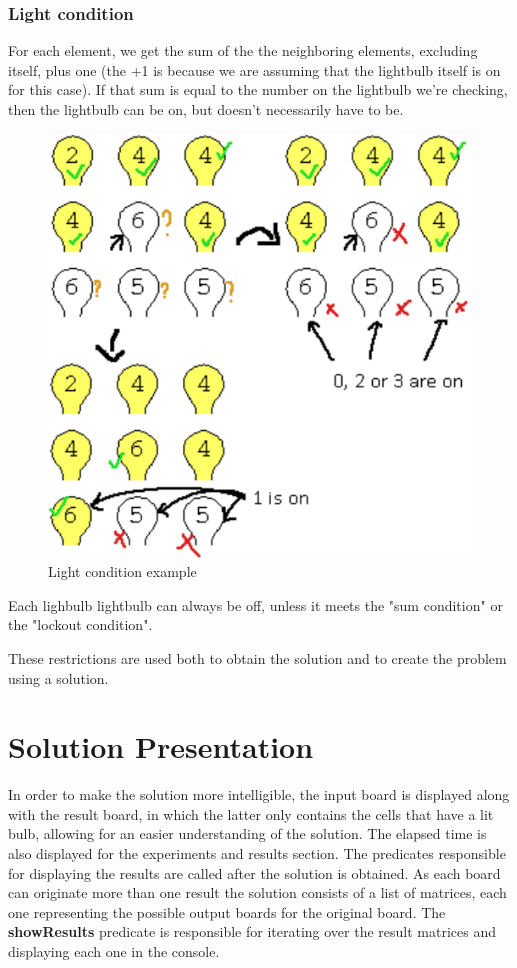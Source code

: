 \documentclass[runningheads]{llncs}
\begin{document}
\subsubsection*{Light condition} \hfill \break
For each element, we get the sum of the the neighboring elements, excluding itself, plus one (the +1 is because we are assuming that the lightbulb itself is on for this case).
If that sum is equal to the number on the lightbulb we're checking, then the lightbulb can be on, but doesn't necessarily have to be.

\begin{figure}
	\includegraphics[scale=0.5]{lightbulb_light_condition_example}
	\centering
	\caption{Light condition example}
	\centering
\end{figure}

Each lighbulb lightbulb can always be off, unless it meets the "sum condition" or the "lockout condition".

These restrictions are used both to obtain the solution and to create the problem using a solution.



\clearpage
\section{Solution Presentation}
In order to make the solution more intelligible, the input board is displayed along with the result board, in which the latter
only contains the cells that have a lit bulb, allowing for an easier understanding of the solution. The elapsed time is also displayed for the experiments and results section.
The predicates responsible for displaying the results are called after the solution is obtained. As each board can originate more than one result the solution consists of a list of matrices, each one representing the possible output boards for the original board. The \textbf{showResults} predicate is responsible for iterating over the result matrices and displaying each one in the console.
\end{document}
